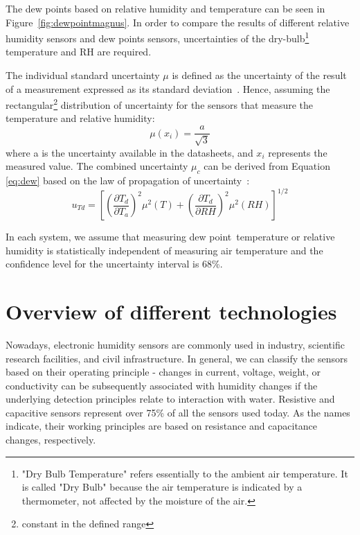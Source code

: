 The dew points based on relative humidity and temperature can be seen in Figure~\ref{fig:dewpointmagnus}. In order to compare the results of different relative humidity sensors and dew points sensors, uncertainties of the dry-bulb\footnote{"Dry Bulb Temperature" refers essentially to the ambient air temperature. It is called "Dry Bulb" because the air temperature is indicated by a thermometer, not affected by the moisture of the air.} temperature and \gls{RH} are required.

The individual standard uncertainty $\mu$ is defined as the uncertainty of the result of a measurement expressed as its standard deviation~\cite{NIST_1994}. Hence, assuming the rectangular\footnote{constant in the defined range} distribution of uncertainty for the sensors that measure the temperature and relative humidity:
\begin{equation}
    \mu(x_{i}) = \frac{a}{\sqrt{3}}
\end{equation}
where a is the uncertainty available in the datasheets, and $x_{i}$ represents the measured value. The combined uncertainty $\mu_{c}$ can be derived from Equation \ref{eq:dew} based on the law of propagation of uncertainty~\cite{dp_uncertainty}:
\begin{equation}
    u_{Td} = \left [  \left (\frac{\partial T_{d}}{\partial T_{a}}  \right )^{2} \mu^{2}(T) + \left (\frac{\partial T_{d}}{\partial RH}  \right )^{2} \mu^{2}(RH)\right ]^{1/2}
    \label{dp_error}
\end{equation}

In each system, we assume that measuring dew point temperature or relative humidity is statistically independent of measuring air temperature and the confidence level for the uncertainty interval is 68\%.  

\section{Overview of different technologies}

Nowadays, electronic humidity sensors are commonly used in industry, scientific research facilities, and civil infrastructure. In general, we can classify the sensors based on their operating principle - changes in current, voltage, weight, or conductivity can be subsequently associated with humidity changes if the underlying detection principles relate to interaction with water. Resistive and capacitive sensors represent over 75\% of all the sensors used today. As the names indicate, their working principles are based on resistance and capacitance changes, respectively.


